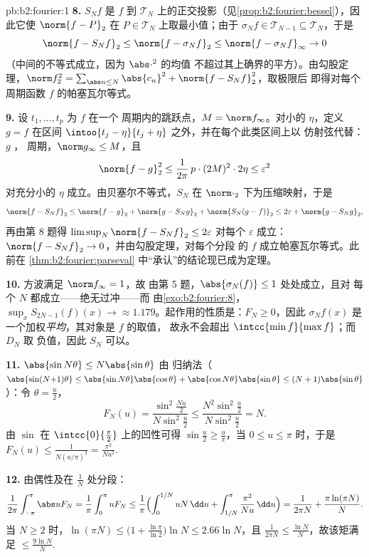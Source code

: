 \begin{solution}{pb:b2:fourier:1}
\textbf{8.} $S_Nf$ 是 $f$ 到
$\mathcal T_N$ 上的正交投影（见\cref{prop:b2:fourier:bessel}），因此它使
$\norm{f - P}_2$ 在 $P \in \mathcal T_N$ 上取最小值；由于 $\sigma_Nf
\in \mathcal T_{N-1} \subseteq \mathcal T_N$，于是
\[
\norm{f - S_Nf}_2 \leq \norm{f - \sigma_Nf}_2
\leq \norm{f - \sigma_Nf}_\infty \to 0
\]
（中间的不等式成立，因为 $\abs\cdot^2$ 的均值
不超过其上确界的平方）。由勾股定理，$\norm f_2^2 = \sum_{\abs
n\leq N}\abs{c_n}^2 + \norm{f - S_Nf}_2^2$，取极限后
即得对每个周期函数 $f$ 的帕塞瓦尔等式。

\textbf{9.} 设 $t_1, \dots, t_p$ 为 $f$ 在一个
周期内的跳跃点，$M = \norm f_\infty$。对小的 $\eta$，定义 $g = f$
在区间 $\intoo{t_j - \eta}{t_j + \eta}$ 之外，并在每个此类区间上以
仿射弦代替：$g$ ，
周期，$\norm g_\infty \leq M$，且
\[
\norm{f - g}_2^2 \leq \frac{1}{2\pi}\,p\cdot(2M)^2\cdot2\eta
\leq \varepsilon^2
\]
对充分小的 $\eta$ 成立。由贝塞尔不等式，$S_N$ 在
$\norm\cdot_2$ 下为压缩映射，于是
\[
\norm{f - S_Nf}_2
\leq \norm{f - g}_2 + \norm{g - S_Ng}_2 + \norm{S_N(g -
f)}_2
\leq 2\varepsilon + \norm{g - S_Ng}_2 ,
\]
再由第 8 题得 $\limsup_N\norm{f - S_Nf}_2 \leq
2\varepsilon$ 对每个 $\varepsilon$ 成立：$\norm{f - S_Nf}_2 \to
0$，并由勾股定理，对每个分段
的 $f$ 成立帕塞瓦尔等式。此前在
\cref{thm:b2:fourier:parseval} 中“承认”的结论现已成为定理。

\textbf{10.} 方波满足 $\norm f_\infty = 1$，故
由第 5 题，$\abs{\sigma_N(f)} \leq 1$ 处处成立，且对
每个 $N$ 都成立——绝无过冲——而
由\cref{exo:b2:fourier:8}，$\sup_xS_{2N-1}(f)(x) \to
\approx 1.179$。起作用的性质是：$F_N \geq 0$，因此
$\sigma_Nf(x)$ 是一个加权\emph{平均}，其对象是 $f$ 的取值，
故永不会超出 $\intcc{\min f}{\max f}$；而 $D_N$ 取
负值，因此 $S_N$ 可以。

\textbf{11.} $\abs{\sin N\theta} \leq N\abs{\sin\theta}$ 由
归纳法（$\abs{\sin(N{+}1)\theta} \leq
\abs{\sin N\theta}\abs{\cos\theta} +
\abs{\cos N\theta}\abs{\sin\theta} \leq
(N+1)\abs{\sin\theta}$）：令 $\theta = \frac u2$，
\[
F_N(u) = \frac{\sin^2\frac{Nu}2}{N\sin^2\frac u2}
\leq \frac{N^2\sin^2\frac u2}{N\sin^2\frac u2} = N .
\]
由 $\sin$ 在 $\intcc{0}{\frac\pi2}$ 上的凹性可得
$\sin\frac u2 \geq \frac{u}{\pi}$，当 $0 \leq u \leq \pi$ 时，于是
$F_N(u) \leq \frac{1}{N(u/\pi)^2} = \frac{\pi^2}{Nu^2}$.

\textbf{12.} 由偶性及在 $\frac1N$ 处分段：
\[
\frac{1}{2\pi}\int_{-\pi}^{\pi}\abs uF_N
= \frac1\pi\int_0^\pi uF_N
\leq \frac1\pi\Bigl(\int_0^{1/N}uN\,\dd u +
\int_{1/N}^{\pi}\frac{\pi^2}{Nu}\,\dd u\Bigr)
= \frac{1}{2\pi N} + \frac{\pi\ln(\pi N)}{N} .
\]
当 $N \geq 2$ 时，$\ln(\pi N) \leq \bigl(1 +
\frac{\ln\pi}{\ln2}\bigr)\ln N \leq 2.66\ln N$，且
$\frac{1}{2\pi N} \leq \frac{\ln N}{N}$，故该矩满足
$\leq \frac{9\ln N}{N}$.


\end{solution}
